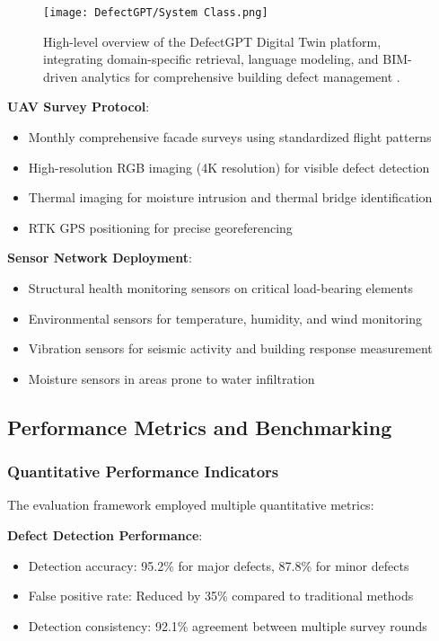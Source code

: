 \begin{figure}[htbp]
    \centering
    \texttt{[image: DefectGPT/System Class.png]}
    \caption{High-level overview of the DefectGPT Digital Twin platform, integrating domain-specific retrieval, language modeling, and BIM-driven analytics for comprehensive building defect management \cite{zhang2024automated}.}
    \label{fig:system-overview}
\end{figure}

\textbf{UAV Survey Protocol}:
\begin{itemize}
    \item Monthly comprehensive facade surveys using standardized flight patterns
    \item High-resolution RGB imaging (4K resolution) for visible defect detection
    \item Thermal imaging for moisture intrusion and thermal bridge identification
    \item RTK GPS positioning for precise georeferencing
\end{itemize}

\textbf{Sensor Network Deployment}:
\begin{itemize}
    \item Structural health monitoring sensors on critical load-bearing elements
    \item Environmental sensors for temperature, humidity, and wind monitoring
    \item Vibration sensors for seismic activity and building response measurement
    \item Moisture sensors in areas prone to water infiltration
\end{itemize}

\subsection{Performance Metrics and Benchmarking}

\subsubsection{Quantitative Performance Indicators}

The evaluation framework employed multiple quantitative metrics:

\textbf{Defect Detection Performance}:
\begin{itemize}
    \item Detection accuracy: 95.2\% for major defects, 87.8\% for minor defects
    \item False positive rate: Reduced by 35\% compared to traditional methods
    \item Detection consistency: 92.1\% agreement between multiple survey rounds
\end{itemize}

